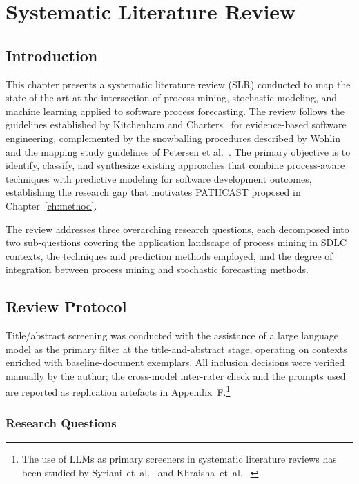 \chapter{Systematic Literature Review}
\label{ch:slr}

\section{Introduction}
\label{sec:slr-intro}

This chapter presents a systematic literature review (SLR) conducted to map
the state of the art at the intersection of process mining, stochastic
modeling, and machine learning applied to software process forecasting. The
review follows the guidelines established by Kitchenham and
Charters~\cite{kitchenham2007} for evidence-based software engineering,
complemented by the snowballing procedures described by
Wohlin~\cite{Wohlin2024} and the mapping study guidelines of Petersen et
al.~\cite{petersen2015}. The primary objective is to identify, classify, and
synthesize existing approaches that combine process-aware techniques with
predictive modeling for software development outcomes, establishing the
research gap that motivates PATHCAST proposed in
Chapter~\ref{ch:method}.

The review addresses three overarching research questions, each decomposed
into two sub-questions covering the application landscape of process mining in
SDLC contexts, the techniques and prediction methods employed, and the degree
of integration between process mining and stochastic forecasting methods.


\section{Review Protocol}
\label{sec:slr-protocol}

Title/abstract screening was conducted with the assistance of a large
language model as the primary filter at the title-and-abstract stage,
operating on contexts enriched with baseline-document exemplars. All
inclusion decisions were verified manually by the author; the cross-model
inter-rater check and the prompts used are reported as replication
artefacts in Appendix~F.\footnote{The use of LLMs as primary screeners in
systematic literature reviews has been studied by
Syriani~et~al.~\cite{syriani2023} and Khraisha~et~al.~\cite{khraisha2024}.}

\subsection{Research Questions}
\label{sec:slr-rqs}

